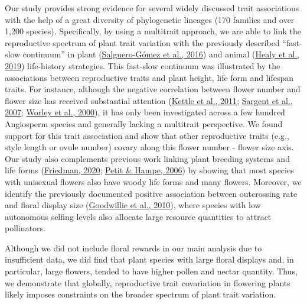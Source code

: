 \documentclass[
  12pt,
  a4paper,
]{article}
\begin{document}
Our study provides strong evidence for several widely discussed trait associations with the help of a great diversity of phylogenetic lineages (170 families and over 1,200 species). Specifically, by using a multitrait approach, we are able to link the reproductive spectrum of plant trait variation with the previously described ``fast-slow continuum'' in plant (\protect\hyperlink{ref-salguero2016}{Salguero-Gómez et al., 2016}) and animal (\protect\hyperlink{ref-healy2019}{Healy et al., 2019}) life-history strategies. This fast-slow continuum was illustrated by the associations between reproductive traits and plant height, life form and lifespan traits. For instance, although the negative correlation between flower number and flower size has received substantial attention (\protect\hyperlink{ref-kettle2011}{Kettle et al., 2011}; \protect\hyperlink{ref-sargent2007}{Sargent et al., 2007}; \protect\hyperlink{ref-worley2000}{Worley et al., 2000}), it has only been investigated across a few hundred Angiosperm species and generally lacking a multitrait perspective. We found support for this trait association and show that other reproductive traits (e.g., style length or ovule number) covary along this flower number - flower size axis. Our study also complements previous work linking plant breeding systems and life forms (\protect\hyperlink{ref-friedman2020}{Friedman, 2020}; \protect\hyperlink{ref-petit2006}{Petit \& Hampe, 2006}) by showing that most species with unisexual flowers also have woody life forms and many flowers. Moreover, we identify the previously documented positive association between outcrossing rate and floral display size (\protect\hyperlink{ref-goodwillie2010}{Goodwillie et al., 2010}), where species with low autonomous selfing levels also allocate large resource quantities to attract pollinators.

Although we did not include floral rewards in our main analysis due to insufficient data, we did find that plant species with large floral displays and, in particular, large flowers, tended to have higher pollen and nectar quantity. Thus, we demonstrate that globally, reproductive trait covariation in flowering plants likely imposes constraints on the broader spectrum of plant trait variation.
\end{document}
